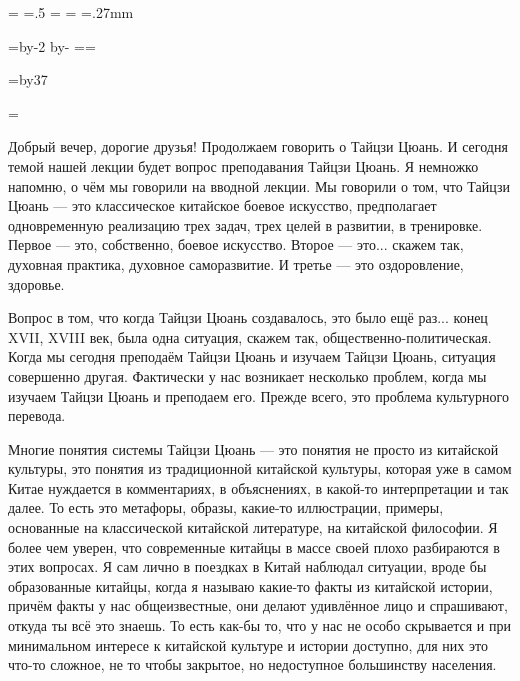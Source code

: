 \pdfpagewidth=297mm
\pdfpageheight=210mm
\pdfhorigin=1in
\pdfvorigin=0pt

\shhtotal=\pdfpagewidth
\htotal=.5\shhtotal
\vtotal=\pdfpageheight
\shoutline=0pt
\shstaplewidth=0pt
\shcrop=0pt
\shfootline={}
\shthickness=.27mm
\qtwopages \shipout\vbox{}

\horigin=10mm
\hsize=\htotal \advance\hsize by-2\horigin
\advance\hsize by-\QUIRE
\output={\ifodd\pageno\else\hoffset=\QUIRE\fi \plainoutput}

\vorigin=7mm
\vsize=\topskip \advance\vsize by37\baselineskip

\footline={\line{\hss\tenrm\folio\hss}}


Добрый вечер, дорогие друзья! Продолжаем говорить о 
Тайцзи Цюань.  И сегодня темой нашей лекции будет 
вопрос преподавания Тайцзи Цюань. Я немножко напомню,
о чём мы говорили на вводной лекции. Мы говорили о том,  
что Тайцзи Цюань --- это классическое китайское боевое
искусство,  предполагает одновременную реализацию 
трех задач, трех целей в развитии, в тренировке. Первое 
--- это, собственно, боевое искусство.  Второе --- это... 
скажем так,  духовная практика, духовное саморазвитие. 
И третье --- это оздоровление,  здоровье.

Вопрос в том, что когда Тайцзи Цюань создавалось, это было ещё
раз... конец XVII, XVIII век, была одна ситуация,  скажем так, 
общественно-политическая. Когда мы сегодня преподаём 
Тайцзи Цюань и изучаем Тайцзи Цюань, ситуация 
совершенно другая.  Фактически у нас возникает 
несколько проблем, когда мы изучаем Тайцзи Цюань и 
преподаем его. Прежде всего, это проблема культурного 
перевода.

Многие понятия системы Тайцзи Цюань ---  это 
понятия не просто из китайской культуры, это понятия
из традиционной китайской культуры,  которая уже в 
самом Китае нуждается в комментариях, в объяснениях, 
в какой-то интерпретации и так далее.  То есть это 
метафоры,  образы,  какие-то иллюстрации, примеры, 
основанные на классической китайской литературе,  на 
китайской философии.  Я более чем уверен, что 
современные китайцы в массе своей плохо разбираются в 
этих вопросах. Я сам лично в поездках в Китай наблюдал 
ситуации,  вроде бы образованные китайцы, когда я 
называю какие-то факты из китайской истории, причём 
факты у нас общеизвестные, они делают удивлённое лицо 
и спрашивают, откуда ты всё это знаешь.  То есть как-бы 
то,  что у нас не особо скрывается и при минимальном 
интересе к китайской культуре и истории доступно, для них это 
что-то сложное, не то чтобы закрытое, но недоступное 
большинству населения.

